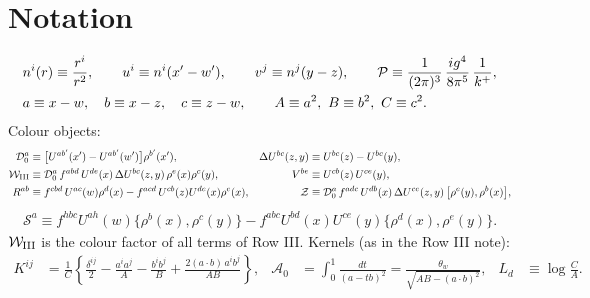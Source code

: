 \documentclass[10pt]{article}
\numberwithin{equation}{section}
\begin{document}
\section{Notation}
\begin{align}
&n^{i}(r)\equiv\frac{r^{i}}{r^{2}},\qquad u^{i}\equiv n^{i}(x'-w'),\qquad v^{j}\equiv n^{j}(y-z),\qquad
\mathcal{P}\equiv\frac{1}{(2\pi)^{3}}\,\frac{ig^{4}}{8\pi^{5}}\,\frac{1}{k^{+}},\notag\\
&a\equiv x-w,\quad b\equiv x-z,\quad c\equiv z-w,\qquad A\equiv a^{2},\ B\equiv b^{2},\ C\equiv c^{2}.
\end{align}
Colour objects:
\begin{align}
\mathcal{D}_{0}^{a}&\equiv\big[U^{ab'}(x')-U^{ab'}(w')\big]\rho^{b'}(x'), &
\Delta U^{bc}(z,y)&\equiv U^{bc}(z)-U^{bc}(y),\notag\\
\mathcal{W}_{\rm III}&\equiv\mathcal{D}_{0}^{a}\,f^{abd}\,U^{de}(x)\,\Delta U^{bc}(z,y)\,\rho^{e}(x)\rho^{c}(y), &
V^{be}&\equiv U^{cb}(z)\,U^{ce}(y),\notag\\
R^{ab}&\equiv f^{cbd}\,U^{ac}(w)\rho^{d}(x)-f^{acd}\,U^{cb}(z)U^{de}(x)\rho^{e}(x), &
\mathcal{Z}&\equiv\mathcal{D}_{0}^{a}\,f^{adc}\,U^{db}(x)\,\Delta U^{ce}(z,y)\,\big[\rho^{e}(y),\rho^{b}(x)\big], \label{eq:colour}
\end{align}
\begin{align}
\mathcal{S}^{a}\equiv f^{hbc}U^{ah}(w)\{\rho^{b}(x),\rho^{c}(y)\}-f^{abc}U^{bd}(x)U^{ce}(y)\{\rho^{d}(x),\rho^{e}(y)\}.
\end{align}
$\mathcal{W}_{\rm III}$ is the colour factor of all terms of Row III. Kernels (as in the Row III note):
\begin{align}
K^{ij}&=\frac{1}{C}\left\{\frac{\delta^{ij}}{2}-\frac{a^{i}a^{j}}{A}-\frac{b^{i}b^{j}}{B}+\frac{2(a\cdot b)\,a^{i}b^{j}}{AB}\right\}, &
\mathcal{A}_{0}&=\int_{0}^{1}\frac{dt}{(a-tb)^{2}}=\frac{\theta_{w}}{\sqrt{AB-(a\cdot b)^{2}}}, &
L_{d}&\equiv\log\frac{C}{A}.
\end{align}
\end{document}
